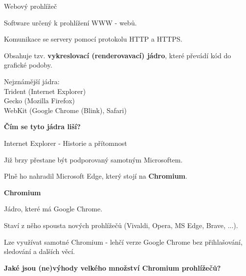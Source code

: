 \documentclass[aspectratio=169]{beamer}
\begin{document}
\begin{frame}{Webový prohlížeč}
    \begin{cardTiny}
        \begin{flushleft}
            Software určený k prohlížení WWW - webů.

            Komunikace se servery pomocí protokolu HTTP a HTTPS.

            Obsahuje tzv. \textbf{vykreslovací (renderovavací) jádro}, které převádí kód do grafické podoby.

            \vspace{2ex}

            Nejznámější jádra:\\Trident (Internet Explorer)\\Gecko (Mozilla Firefox)\\WebKit (Google Chrome (Blink), Safari)
        \end{flushleft}
    \end{cardTiny}
    \begin{cardTiny}
        \begin{center}
            \textbf{Čím se tyto jádra liší?}
        \end{center}
    \end{cardTiny}
\end{frame}

\begin{frame}{Internet Explorer - Historie a přítomnost}
    \begin{cardTiny}
        \begin{flushleft}
            Již brzy přestane být podporovaný samotným Microsoftem.

            Plně ho nahradil Microsoft Edge, který stojí na \textbf{Chromium}.
        \end{flushleft}
    \end{cardTiny}
    \begin{cardTiny}
        \begin{flushleft}
            \textbf{Chromium}

            Jádro, které má Google Chrome.

            Staví z něho spousta nových prohlížečů (Vivaldi, Opera, MS Edge, Brave, ...).

            Lze využívat samotné Chromium - lehčí verze Google Chrome bez přihlašování, sledování a dalších věcí.     
        \end{flushleft}
    \end{cardTiny}
    \begin{cardTiny}
        \begin{center}
            \textbf{Jaké jsou (ne)výhody velkého množství Chromium prohlížečů?}
        \end{center}
    \end{cardTiny}
\end{frame}
\end{document}
